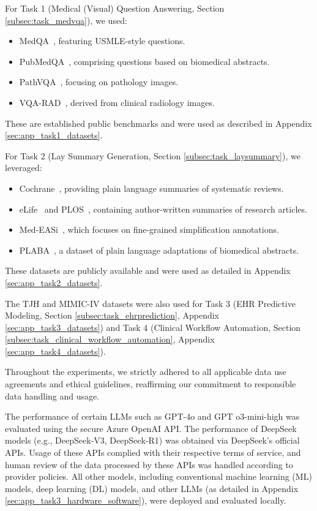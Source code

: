 \documentclass{article}
\begin{document}
For Task 1 (Medical (Visual) Question Answering, Section \ref{subsec:task_medvqa}), we used:
\begin{itemize}
    \item MedQA~\cite{jin2021medqa}, featuring USMLE-style questions.
    \item PubMedQA~\cite{jin2019pubmedqa}, comprising questions based on biomedical abstracts.
    \item PathVQA~\cite{he2020pathvqa}, focusing on pathology images.
    \item VQA-RAD~\cite{lau2018VQA_RAD}, derived from clinical radiology images.
\end{itemize}
These are established public benchmarks and were used as described in Appendix \ref{sec:app_task1_datasets}.

For Task 2 (Lay Summary Generation, Section \ref{subsec:task_laysummary}), we leveraged:
\begin{itemize}
    \item Cochrane~\cite{devaraj2021cochrane}, providing plain language summaries of systematic reviews.
    \item eLife~\cite{goldsack2022elife_plos} and PLOS~\cite{goldsack2022elife_plos}, containing author-written summaries of research articles.
    \item Med-EASi~\cite{basu2023MedEASi}, which focuses on fine-grained simplification annotations.
    \item PLABA~\cite{attal2023plaba}, a dataset of plain language adaptations of biomedical abstracts.
\end{itemize}
These datasets are publicly available and were used as detailed in Appendix \ref{sec:app_task2_datasets}.

The TJH and MIMIC-IV datasets were also used for Task 3 (EHR Predictive Modeling, Section \ref{subsec:task_ehrprediction}, Appendix \ref{sec:app_task3_datasets}) and Task 4 (Clinical Workflow Automation, Section \ref{subsec:task_clinical_workflow_automation}, Appendix \ref{sec:app_task4_datasets}).

Throughout the experiments, we strictly adhered to all applicable data use agreements and ethical guidelines, reaffirming our commitment to responsible data handling and usage.

The performance of certain LLMs such as GPT-4o and GPT o3-mini-high was evaluated using the secure Azure OpenAI API. The performance of DeepSeek models (e.g., DeepSeek-V3, DeepSeek-R1) was obtained via DeepSeek's official APIs. Usage of these APIs complied with their respective terms of service, and human review of the data processed by these APIs was handled according to provider policies. All other models, including conventional machine learning (ML) models, deep learning (DL) models, and other LLMs (as detailed in Appendix \ref{sec:app_task3_hardware_software}), were deployed and evaluated locally.
\end{document}
